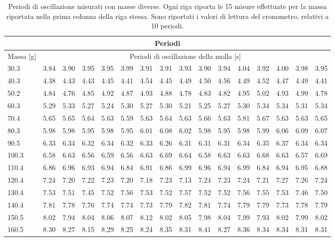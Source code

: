 \begin{table}
    \centering
    \scriptsize
    \begin{tabular}{l | c c c c c c c c c c c c c c c}
        \multicolumn{16}{c}{\small \textbf{Periodi}} \\[1mm]
        \toprule
        {\footnotesize Massa [g]} & \multicolumn{15}{c}{\footnotesize Periodi di oscillazione della molla [s]} \\
        \midrule
		30.3 & 3.84 & 3.90 & 3.95 & 3.95 & 3.99 & 3.91 & 3.91 & 3.93 & 3.90 & 3.94 & 4.04 & 3.92 & 4.00 & 3.98 & 3.95 \\
		40.3 & 4.38 & 4.43 & 4.43 & 4.45 & 4.41 & 4.54 & 4.45 & 4.49 & 4.50 & 4.56 & 4.49 & 4.52 & 4.47 & 4.49 & 4.41 \\
		50.2 & 4.84 & 4.76 & 4.85 & 4.92 & 4.87 & 4.93 & 4.88 & 4.78 & 4.83 & 4.82 & 4.95 & 5.02 & 4.93 & 4.99 & 4.78 \\
		60.3 & 5.29 & 5.33 & 5.27 & 5.24 & 5.30 & 5.27 & 5.30 & 5.21 & 5.25 & 5.27 & 5.30 & 5.34 & 5.34 & 5.31 & 5.34 \\
		70.4 & 5.65 & 5.65 & 5.64 & 5.63 & 5.59 & 5.63 & 5.64 & 5.63 & 5.66 & 5.63 & 5.81 & 5.67 & 5.63 & 5.63 & 5.65 \\
		80.3 & 5.98 & 5.98 & 5.95 & 5.98 & 5.95 & 6.01 & 6.08 & 6.02 & 5.98 & 5.95 & 5.98 & 5.99 & 6.06 & 6.09 & 6.07 \\
		90.5 & 6.33 & 6.34 & 6.32 & 6.34 & 6.32 & 6.33 & 6.26 & 6.31 & 6.31 & 6.31 & 6.34 & 6.35 & 6.37 & 6.34 & 6.34 \\
		100.3 & 6.58 & 6.63 & 6.56 & 6.59 & 6.56 & 6.63 & 6.69 & 6.64 & 6.58 & 6.63 & 6.63 & 6.68 & 6.63 & 6.57 & 6.69 \\
		110.4 & 6.86 & 6.96 & 6.93 & 6.94 & 6.84 & 6.91 & 6.86 & 6.99 & 6.96 & 6.94 & 6.99 & 6.84 & 6.94 & 6.95 & 6.88 \\
		120.4 & 7.24 & 7.20 & 7.22 & 7.23 & 7.20 & 7.18 & 7.23 & 7.13 & 7.24 & 7.23 & 7.24 & 7.21 & 7.27 & 7.26 & 7.24 \\
		130.4 & 7.53 & 7.51 & 7.45 & 7.52 & 7.56 & 7.53 & 7.52 & 7.57 & 7.52 & 7.52 & 7.56 & 7.55 & 7.53 & 7.46 & 7.50 \\
		140.4 & 7.81 & 7.78 & 7.76 & 7.74 & 7.74 & 7.73 & 7.79 & 7.82 & 7.81 & 7.74 & 7.79 & 7.79 & 7.73 & 7.78 & 7.79 \\
		150.5 & 8.02 & 7.94 & 8.04 & 8.06 & 8.07 & 8.12 & 8.02 & 8.05 & 7.98 & 8.04 & 7.99 & 7.93 & 8.02 & 7.99 & 8.02 \\
		160.5 & 8.30 & 8.27 & 8.15 & 8.29 & 8.25 & 8.24 & 8.35 & 8.31 & 8.41 & 8.27 & 8.36 & 8.34 & 8.34 & 8.31 & 8.31 \\
        \bottomrule
    \end{tabular}
    \caption{Periodi di oscillazione misurati con masse diverse. Ogni riga riporta le 15 misure effettuate per la massa
    riportata nella prima colonna della riga stessa. Sono riportati i valori di lettura del cronometro, relativi a 10
    periodi.}
    \label{tab:periodi}
\end{table}

